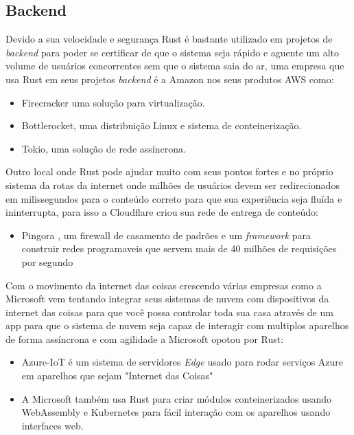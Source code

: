 \subsection{Backend}
\par
Devido a sua velocidade e seguran\c{c}a Rust \'{e} bastante utilizado em projetos de \textit{backend} para poder se certificar de que o sistema seja r\'{a}pido e aguente um alto volume de usu\'{a}rios concorrentes sem que o sistema saia do ar, uma empresa que usa Rust em seus projetos \textit{backend} \'{e} a Amazon nos seus produtos AWS como:
\begin{itemize}
\item Firecracker uma solu\c{c}\~{a}o para virtualiza\c{c}\~{a}o.
\item Bottlerocket, uma distribui\c{c}\~{a}o Linux e sistema de conteineriza\c{c}\~{a}o.
\item Tokio, uma solu\c{c}\~{a}o de rede ass\'{i}ncrona.
\end{itemize}
\par
Outro local onde Rust pode ajudar muito com seus pontos fortes e no pr\'{o}prio sistema da rotas da internet onde milh\~{o}es de usu\'{a}rios devem ser redirecionados em milissegundos para o conte\'{u}do correto para que sua experi\^{e}ncia seja flu\'{i}da e ininterrupta, para isso a Cloudflare criou sua rede de entrega de conte\'{u}do:
\begin{itemize}
  \item Pingora \cite{Wu24}, um firewall de casamento de padr\~{o}es e um \textit{framework} para construir redes programaveis que servem mais de 40 milh\~{o}es de requisi\c{c}\~{o}es por segundo
\end{itemize}
\par
Com o movimento da internet das coisas crescendo v\'{a}rias empresas como a Microsoft vem tentando integrar seus sistemas de nuvem com dispositivos da internet das coisas para que voc\^{e} possa controlar toda sua casa atrav\'{e}s de um app para que o sistema de nuvem seja capaz de interagir com multiplos aparelhos de forma ass\'{i}ncrona e com agilidade a Microsoft opotou por Rust:
\begin{itemize}
\item Azure-IoT \'{e} um sistema de servidores \textit{Edge} usado para rodar servi\c{c}os Azure em aparelhos que sejam "Internet das Coisas"
\item A Microsoft tamb\'{e}m usa Rust para criar m\'{o}dulos conteinerizados usando WebAssembly e Kubernetes para f\'{a}cil intera\c{c}\~{a}o com os aparelhos usando interfaces web.
\end{itemize}

